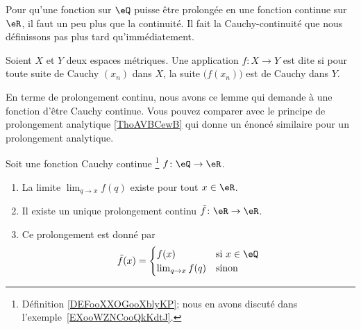 Pour qu'une fonction sur \( \eQ\) puisse être prolongée en une fonction continue sur \( \eR\), il faut un peu plus que la continuité. Il fait la Cauchy-continuité que nous définissons pas plus tard qu'immédiatement.

\begin{definition}        \label{DEFooXXOGooXblyKP}
	Soient \( X\) et \( Y\) deux espaces métriques. Une application \( f\colon X\to Y\) est dite  si pour toute suite de Cauchy \( (x_n)\) dans \( X\), la suite \( \big( f(x_n) \big)\) est de Cauchy dans \( Y\).
\end{definition}

En terme de prolongement continu, nous avons ce lemme qui demande à une fonction d'être Cauchy continue. Vous pouvez comparer avec le principe de prolongement analytique \ref{ThoAVBCewB} qui donne un énoncé similaire pour un prolongement analytique.
\begin{lemma}        \label{LEMooUAFBooAwiXxj}
	Soit une fonction Cauchy continue \footnote{Définition \ref{DEFooXXOGooXblyKP}; nous en avons discuté dans l'exemple~\ref{EXooWZNCooQkKdtJ}.} \( f\colon \eQ\to \eR\).
	\begin{enumerate}
		\item
		      La limite \( \lim_{q\to x} f(q)\) existe pour tout \( x\in \eR\).
		\item
		      Il existe un unique prolongement continu \( \tilde f\colon \eR\to \eR\).
		\item
		      Ce prolongement est donné par
		      \begin{equation}
			      \tilde f(x)=\begin{cases}
				      f(x)               & \text{si } x\in \eQ \\
				      \lim_{q\to x} f(q) & \text{sinon }
			      \end{cases}
		      \end{equation}
	\end{enumerate}
\end{lemma}

